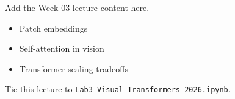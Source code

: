 Add the Week 03 lecture content here.

\begin{itemize}
  \item Patch embeddings
  \item Self-attention in vision
  \item Transformer scaling tradeoffs
\end{itemize}

Tie this lecture to \texttt{Lab3\_Visual\_Transformers-2026.ipynb}.
